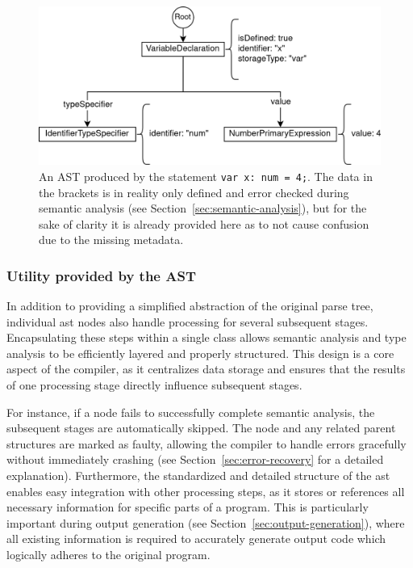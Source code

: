 \begin{figure}[h!]
	\centering
	\includegraphics[scale=1]{./pics/AST.drawio}
	\caption{An AST produced by the statement \lstinline|var x: num = 4;|. The data in the brackets is in reality only defined and error checked during semantic analysis (see Section~\ref{sec:semantic-analysis}), but for the sake of clarity it is already provided here as to not cause confusion due to the missing metadata.}
	\label{fig:implementation:ast}
\end{figure}

\subsubsection{Utility provided by the AST}

In addition to providing a simplified abstraction of the original parse tree, individual \acrshort{ast} nodes also handle processing for several subsequent stages. Encapsulating these steps within a single class allows semantic analysis and type analysis to be efficiently layered and properly structured. This design is a core aspect of the compiler, as it centralizes data storage and ensures that the results of one processing stage directly influence subsequent stages.

For instance, if a node fails to successfully complete semantic analysis, the subsequent stages are automatically skipped. The node and any related parent structures are marked as faulty, allowing the compiler to handle errors gracefully without immediately crashing (see Section~\ref{sec:error-recovery} for a detailed explanation). Furthermore, the standardized and detailed structure of the \acrshort{ast} enables easy integration with other processing steps, as it stores or references all necessary information for specific parts of a program. This is particularly important during output generation (see Section~\ref{sec:output-generation}), where all existing information is required to accurately generate output code which logically adheres to the original program.

